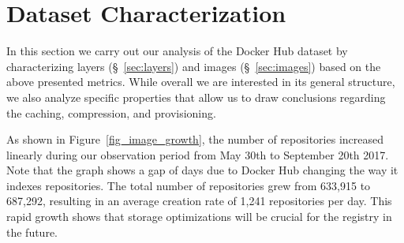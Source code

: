 \section{Dataset Characterization}
\label{sec:char}

In this section we carry out our analysis of the Docker Hub dataset by characterizing
layers (\S~\ref{sec:layers}) and images (\S~\ref{sec:images}) based on
the above presented metrics. While overall we are interested in its general structure,
we also analyze specific properties that allow us to draw conclusions regarding the
caching, compression, and provisioning.

As shown in Figure~\ref{fig_image_growth}, the number of repositories increased
linearly during our observation period from May 30th to September 20th
2017. Note that the graph shows a gap of \gap days due to Docker Hub changing the way it
indexes repositories. The total number of repositories
grew from 633,915 to 687,292, resulting in an average creation rate of 1,241
repositories per day. This rapid growth shows that storage optimizations will
be crucial for the registry in the future.

%


